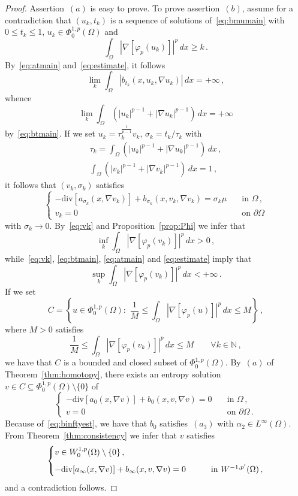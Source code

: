 \documentclass[twoside,reqno]{amsart}
\numberwithin{equation}{section}
\theoremstyle{definition}
\newcommand{\N}{\mathbb{N}}
\begin{document}
%
\begin{proof}
Assertion~$(a)$ is easy to prove.
To prove assertion~$(b)$, assume for a contradiction that
$(u_k,t_k)$ is a sequence of solutions
of~\eqref{eq:bmumain} with $0\leq t_k\leq 1$, 
$u_k\in\Phi^{1,p}_0(\Omega)$ and 
\[
\int_\Omega |\nabla[\varphi_p(u_k)]|^p\,dx \geq k\,.
\]
By~\eqref{eq:atmain} and~\eqref{eq:estimate}, it follows
\[
\lim_k \int_\Omega |b_{t_k}(x,u_k,\nabla u_k)|\,dx = +\infty\,,
\]
whence
\[
\lim_k \int_\Omega \left(|u_k|^{p-1} 
+ |\nabla u_k|^{p-1}\right)\,dx = +\infty
\]
by~\eqref{eq:btmain}.
If we set $u_k=\tau_k^{\frac{1}{p-1}} v_k$, $\sigma_k=t_k/\tau_k$ 
with 
\begin{gather}
\tau_k = \int_\Omega \left(|u_k|^{p-1} 
+ |\nabla u_k|^{p-1}\right)\,dx\,,\\
\label{eq:vk}
\int_\Omega \left(|v_k|^{p-1} 
+ |\nabla v_k|^{p-1}\right)\,dx = 1\,,
\end{gather}
it follows that $(v_k,\sigma_k)$ satisfies
\[
\begin{cases}
- \mathrm{div}[a_{\sigma_k}(x,\nabla v_k)] 
+ b_{\sigma_k}(x,v_k,\nabla v_k)=
{\sigma_k}\mu
&\quad\text{in $\Omega$}\,,\\
v_k=0
&\quad\text{on $\partial\Omega$}
\end{cases}
\]
with $\sigma_k\to 0$.
By~\eqref{eq:vk} and Proposition~\ref{prop:Phi} we infer that
\[
\inf_k 
\int_\Omega |\nabla[\varphi_p(v_k)]|^p\,dx >0\,,
\]
while~\eqref{eq:vk}, \eqref{eq:btmain}, \eqref{eq:atmain} and
\eqref{eq:estimate} imply that
\[
\sup_k 
\int_\Omega |\nabla[\varphi_p(v_k)]|^p\,dx < +\infty\,.
\]
If we set
\[
C = \left\{u\in\Phi^{1,p}_0(\Omega):\,\,
\frac{1}{M} \leq \int_\Omega |\nabla[\varphi_p(u)]|^p\,dx
\leq M\right\}\,,
\]
where $M>0$ satisfies
\[
\frac{1}{M} \leq \int_\Omega |\nabla[\varphi_p(v_k)]|^p\,dx
\leq M\qquad\forall k\in\N\,,
\]
we have that $C$ is a bounded and closed subset of 
$\Phi^{1,p}_0(\Omega)$.
By~$(a)$ of Theorem~\ref{thm:homotopy}, there exists an entropy 
solution $v\in C\subseteq \Phi^{1,p}_0(\Omega)\setminus\{0\}$ of
\[
\begin{cases}
- \mathrm{div}[a_0(x,\nabla v)] + b_0(x,v,\nabla v)= 0
&\quad\text{in $\Omega$}\,,\\
v=0
&\quad\text{on $\partial\Omega$}\,.
\end{cases}
\]
Because of~\eqref{eq:binftyest}, we have that $b_0$
satisfies~$(a_3)$ with $\alpha_2\in L^\infty(\Omega)$.
From Theorem~\ref{thm:consistency} we infer that $v$ satisfies
\[
\begin{cases}
v\in W^{1,p}_0(\Omega)\setminus\{0\}\,,\\
\noalign{\medskip}
- \mathrm{div}[a_{\infty}(x,\nabla v)] 
+ b_{\infty}(x,v,\nabla v)=0
&\qquad\text{in $W^{-1,p'}(\Omega)$}\,,
\end{cases}
\]
and a contradiction follows.
\end{proof}
\end{document}
